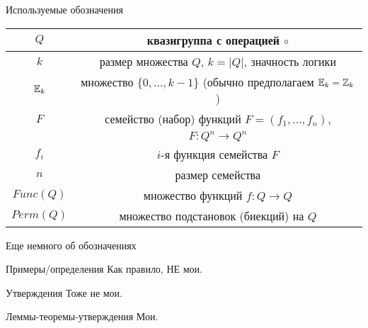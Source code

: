 \begin{frame}{Используемые обозначения}
    \begin{table}
        \begin{center}
            \begin{tabular}{|c|c|}
                \hline
                $Q$ &квазигруппа с операцией $\circ$ \\
                \hline 
                $k$ & размер множества $Q$, $k = \lvert Q \rvert$, значность логики \\
                \hline
                $\mathbb{E}_k$ & множество $\{0, \ldots, k-1 \}$ (обычно предполагаем $\mathbb{E}_k = \mathbb{Z}_k$) \\
                \hline
                $F$ & семейство (набор) функций $F = (f_1, \ldots, f_n)$, \\
                    & $F \colon Q^n \to Q^n$ \\
                \hline 
                $f_i$ & $i$-я функция семейства $F$ \\
                \hline
                $n$ & размер семейства \\
                \hline
                $Func(Q)$ & множество функций $f \colon Q \to Q$ \\
                \hline 
                $Perm(Q)$ & множество подстановок (биекций) на $Q$ \\
                \hline
            \end{tabular}
        \end{center}
    \end{table}
\end{frame}


\begin{frame}{Еще немного об обозначениях}

    \begin{myexample}{Примеры/определения}
        Как правило, НЕ мои.
    \end{myexample}

    \begin{mypropos}{Утверждения}
        Тоже не мои.
    \end{mypropos}

    \begin{mytheorem}{Леммы-теоремы-утверждения}
        Мои.
    \end{mytheorem}

\end{frame}


